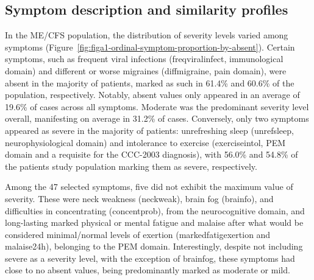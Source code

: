 \subsection{Symptom description and similarity profiles}

In the ME/CFS population, the distribution of severity levels varied among symptoms (Figure~\ref{fig:figa1-ordinal-symptom-proportion-by-absent}).
Certain symptoms, such as frequent viral infections (freqviralinfect, immunological domain) and different or worse migraines (diffmigraine, pain domain), were absent in the majority of patients, marked as such in 61.4\% and 60.6\% of the population, respectively.
Notably, absent values only appeared in an average of 19.6\% of cases across all symptoms.
Moderate was the predominant severity level overall, manifesting on average in 31.2\% of cases.
Conversely, only two symptoms appeared as severe in the majority of patients: unrefreshing sleep (unrefsleep, neurophysiological domain) and intolerance to exercise (exerciseintol, PEM domain and a requisite for the CCC-2003 diagnosis), with 56.0\% and 54.8\% of the patients study population marking them as severe, respectively.

Among the 47 selected symptoms, five did not exhibit the maximum value of severity.
These were neck weakness (neckweak), brain fog (brainfo), and difficulties in concentrating (concentprob), from the neurocognitive domain, and long-lasting marked physical or mental fatigue and malaise after what would be considered minimal/normal levels of exertion (markedfatigexertion and malaise24h), belonging to the PEM domain.
Interestingly, despite not including severe as a severity level, with the exception of brainfog, these symptoms had close to no absent values, being predominantly marked as moderate or mild.


